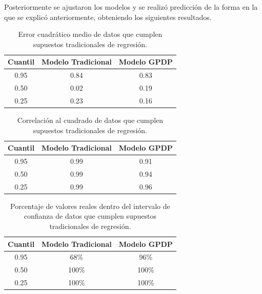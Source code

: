 Posteriormente se ajustaron los modelos y se realiz\'o predicci\'on de la forma en la que se explic\'o anteriormente, obteniendo los siguientes resultados.

\begin{table}[H]
\centering
\caption{Error cuadrático medio de datos que cumplen supuestos tradicionales de regresi\'on.} 
\begin{tabular}{ccc}
  \hline
Cuantil & Modelo Tradicional & Modelo GPDP \\ 
  \hline
0.95 & 0.84 & 0.83 \\ 
  0.50 & 0.02 & 0.19 \\ 
  0.25 & 0.23 & 0.16 \\ 
   \hline
\end{tabular}
\label{mse_classic}
\end{table}

\begin{table}[H]
\centering
\caption{Correlación al cuadrado de datos que cumplen supuestos tradicionales de regresi\'on.} 
\begin{tabular}{ccc}
  \hline
Cuantil & Modelo Tradicional & Modelo GPDP \\ 
  \hline
0.95 & 0.99 & 0.91 \\ 
  0.50 & 0.99 & 0.94 \\ 
  0.25 & 0.99 & 0.96 \\ 
   \hline
\end{tabular}
\label{corr_classic}
\end{table}

\begin{table}[H]
\centering
\caption{Porcentaje de valores reales dentro del intervalo de confianza de datos que cumplen supuestos tradicionales de regresi\'on.} 
\begin{tabular}{ccc}
  \hline
Cuantil & Modelo Tradicional & Modelo GPDP \\ 
  \hline
0.95 & 68\% & 96\% \\ 
  0.50 & 100\% & 100\% \\ 
  0.25 & 100\% & 100\% \\ 
   \hline
\end{tabular}
\label{within_classic}
\end{table}

